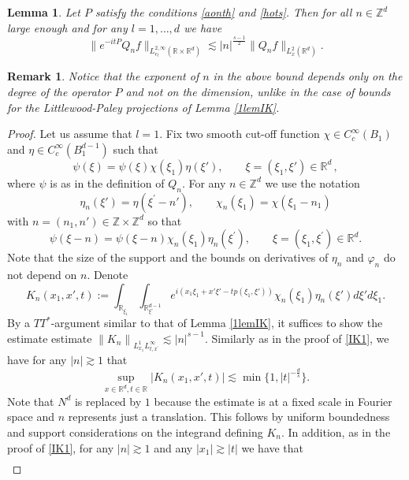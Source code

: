 \documentclass[10pt,leqno]{amsart}
\newtheorem{lem}[thm]{Lemma}
\newtheorem{rmq}[thm]{Remark}
\newcommand{\R}{\mathbb{R}}
\numberwithin{equation}{section}
\newcommand{\Z}{\mathbb{Z}}
\begin{document}
\begin{lem}
\label{lemIO}
Let \(P\) satisfy the conditions \eqref{aonth} and \eqref{hots}. Then for all $n\in \Z^d$ large enough and for any $l=1,\ldots ,d$ we have 
\begin{equation*}
\|e^{-it P } Q_n f\|_{L_{e_l}^{2,\infty} (\R \times \R^d)}\lesssim |n|^{\frac{s-1}{2}} \|Q_n f\|_{L_x^2 (\R^d )}.
\end{equation*}
\end{lem}
\begin{rmq}
Notice that the exponent of \(n\) in the above bound depends only on the degree of the operator \(P\) and not on the dimension, unlike in the case of bounds for the Littlewood-Paley projections of Lemma \ref{1lemIK}.
\end{rmq}

\begin{proof}
Let us assume that \(l=1\). Fix two smooth cut-off function $\chi\in C^{\infty}_{c}(B_{1})$ and $\eta\in C^{\infty}_{c}(B_{1}^{d-1})$ such that 
$$\psi (\xi)= \psi (\xi) \chi (\xi_1) \eta (\xi') ,\qquad \xi= (\xi_1 ,\xi') \in \R^d \,,$$
where $\psi$ is as in the definition of $Q_n$. For any $n \in \Z^d$ we use the notation
\begin{equation*}
\eta_{n} (\xi') = \eta (\xi^\prime - n'),\qquad \chi_n (\xi_1) = \chi(\xi_1 - n_{1})
\end{equation*}
with \(n=(n_{1},n')\in\Z\times\Z^{d}\) so that
$$\psi (\xi -n)= \psi (\xi -n) \chi_n (\xi_1) \eta_n (\xi^\prime) ,\qquad \xi= (\xi_1 ,\xi^\prime) \in \R^d .$$
Note that the size of the support and the bounds on derivatives of $\eta_n$ and $\varphi_n$ do not depend on $n$. Denote 
$$
K_n(x_1, x', t) := \int_{\R_{\xi_1} }  \int_{\R_{\xi'}^{d-1} }e^{i (x_1 \xi_1 +x' \xi'-t p(\xi_1 , \xi')  )} \chi_n (\xi_1) \eta_n (\xi' ) d\xi' d \xi_1.
$$
By a $TT^\ast$-argument similar to that of  Lemma \ref{1lemIK}, it suffices to  show the estimate estimate $\left\|K_n\right\|_{L_{x_1}^1 L_{t,x^\prime}^\infty}\lesssim|n|^{s-1}$. Similarly as in the proof of \eqref{IK1}, we have for any $|n| \gtrsim 1$ that
$$\sup_{x \in \R^{d} ,t\in \R} |K_n (x_1, x', t)| \lesssim \min \{1, |t|^{-\frac{d}{s}}\}. $$
Note that $N^d$ is replaced by $1$ because the estimate is at a fixed scale in Fourier space and $n$ represents just a translation. This follows by uniform boundedness and support considerations on the integrand defining \(K_{n}\). In addition, as in  the proof of \eqref{IK1}, for any $|n| \gtrsim 1$ and any $|x_1| \gtrsim|t|$ we have that
\begin{align*}

\end{align*}
\end{proof}
\end{document}
